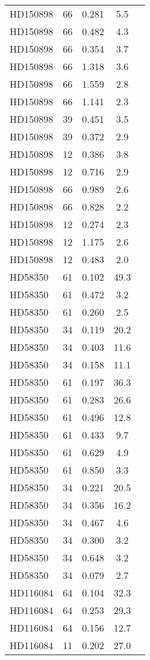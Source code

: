 \begin{table*}
\begin{tabular}{l c c c c}
HD150898 & 66 & 0.281 & 5.5\\ 
HD150898 & 66 & 0.482 & 4.3\\ 
HD150898 & 66 & 0.354 & 3.7\\ 
HD150898 & 66 & 1.318 & 3.6\\ 
HD150898 & 66 & 1.559 & 2.8\\ 
HD150898 & 66 & 1.141 & 2.3\\ 
HD150898 & 39 & 0.451 & 3.5\\ 
HD150898 & 39 & 0.372 & 2.9\\ 
HD150898 & 12 & 0.386 & 3.8\\ 
HD150898 & 12 & 0.716 & 2.9\\ 
HD150898 & 66 & 0.989 & 2.6\\ 
HD150898 & 66 & 0.828 & 2.2\\ 
HD150898 & 12 & 0.274 & 2.3\\ 
HD150898 & 12 & 1.175 & 2.6\\ 
HD150898 & 12 & 0.483 & 2.0\\ 
\hline
HD58350 & 61 & 0.102 & 49.3\\ 
HD58350 & 61 & 0.472 & 3.2\\ 
HD58350 & 61 & 0.260 & 2.5\\ 
HD58350 & 34 & 0.119 & 20.2\\ 
HD58350 & 34 & 0.403 & 11.6\\ 
HD58350 & 34 & 0.158 & 11.1\\ 
HD58350 & 61 & 0.197 & 36.3\\ 
HD58350 & 61 & 0.283 & 26.6\\ 
HD58350 & 61 & 0.496 & 12.8\\ 
HD58350 & 61 & 0.433 & 9.7\\ 
HD58350 & 61 & 0.629 & 4.9\\ 
HD58350 & 61 & 0.850 & 3.3\\ 
HD58350 & 34 & 0.221 & 20.5\\ 
HD58350 & 34 & 0.356 & 16.2\\ 
HD58350 & 34 & 0.467 & 4.6\\ 
HD58350 & 34 & 0.300 & 3.2\\ 
HD58350 & 34 & 0.648 & 3.2\\ 
HD58350 & 34 & 0.079 & 2.7\\ 
\hline
HD116084 & 64 & 0.104 & 32.3\\ 
HD116084 & 64 & 0.253 & 29.3\\ 
HD116084 & 64 & 0.156 & 12.7\\ 
HD116084 & 11 & 0.202 & 27.0\\ 

\end{tabular}
\end{table*}
